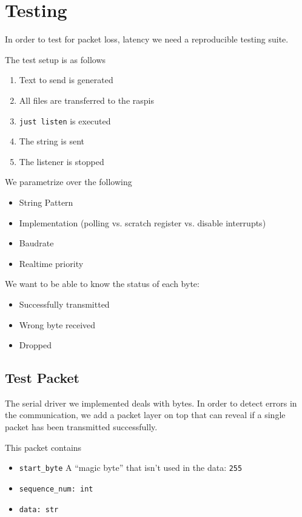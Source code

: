 \documentclass[../main.tex]{subfiles}
\begin{document}
    \clearpage
    \section{Testing}

    In order to test for packet loss, latency we need a reproducible testing suite.

    The test setup is as follows
    \begin{enumerate}
        \item Text to send is generated
        \item All files are transferred to the raspis
        \item \texttt{just listen} is executed
        \item The string is sent
        \item The listener is stopped
    \end{enumerate}

    \bigskip
    We parametrize over the following
    \begin{itemize}
        \item String Pattern
        \item Implementation (polling vs. scratch register vs. disable interrupts)
        \item Baudrate
        \item Realtime priority
    \end{itemize}

    \bigskip
    We want to be able to know the status of each byte:
    \begin{itemize}
        \item Successfully transmitted
        \item Wrong byte received
        \item Dropped
    \end{itemize}

    \subsection{Test Packet}
    The serial driver we implemented deals with bytes. In order to detect errors in the communication, we add a packet layer on top that can reveal if a single packet has been transmitted successfully.

    This packet contains
    \begin{itemize}
        \item \verb|start_byte| A \enquote{magic byte} that isn't used in the data: \verb|255|
        \item \verb|sequence_num: int|
        \item \verb|data: str|
    \end{itemize}
\end{document}
